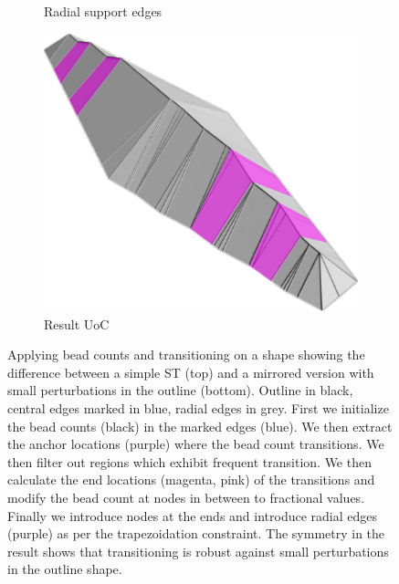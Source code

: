 \begin{figure}
\begin{subfigure}{\figwidth}
\caption{Radial support edges}\label{beading_transitioning_filtering__transitions_applied}
\end{subfigure}
\begin{subfigure}{.27\textwidth}
\hspace*{-.5cm}\includegraphics[width=1.2\columnwidth]{sources-method-beading-transitioning-filtering--result-uoc.pdf}
\caption{Result UoC}\label{beading_transitioning_filtering__result_uoc}
\end{subfigure}
\caption{
Applying bead counts and transitioning on a shape showing the difference between a simple ST (top) and a mirrored version with small perturbations in the outline (bottom).
Outline in black, central edges marked in blue, radial edges in grey.
 First we initialize the bead counts (black) in the marked edges (blue).
 We then extract the anchor locations (purple) where the bead count transitions.
 We then filter out regions which exhibit frequent transition.
 We then calculate the end locations (magenta, pink) of the transitions and modify the bead count at nodes in between to fractional values.
 Finally we introduce nodes at the ends and introduce radial edges (purple) as per the trapezoidation constraint.
The symmetry in the result shows that transitioning is robust against small perturbations in the outline shape.
}
\label{beading_transitioning_filtering}
\end{figure}



